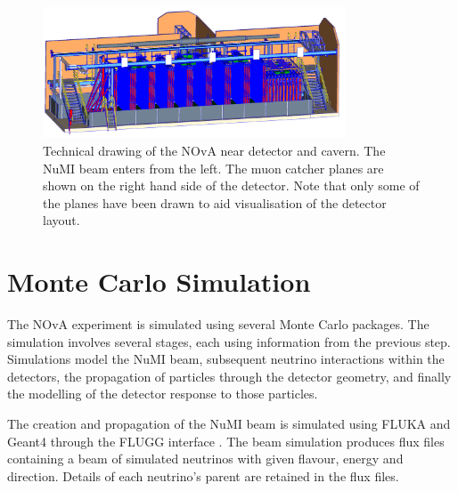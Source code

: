 \begin{figure}
  \centering
  \includegraphics[width=0.8\textwidth]{../../img/baird/det/ND_01.png}
  \caption{Technical drawing of the NOvA near detector and 
    cavern. The NuMI beam enters from the left. The muon
    catcher planes are shown on the right hand side of the
    detector. Note that only some of the planes have been drawn to
    aid visualisation of the detector layout.} 
  \label{fig:neardet}
\end{figure}



\section{Monte Carlo Simulation}

The NOvA experiment is simulated using several Monte Carlo packages.
The simulation involves several stages, each using information
from the previous step. Simulations model the
NuMI beam, subsequent neutrino interactions within the detectors,
the propagation of particles through the detector geometry, and
finally the modelling of the detector response to those particles.

The creation and propagation of the NuMI beam is simulated using FLUKA
and Geant4 through the FLUGG interface \cite{FLUKA, ferrari2005fluka,
  agostinelli2003geant4}. The beam simulation produces flux files
containing a beam of simulated neutrinos with given flavour, energy
and direction. Details of each neutrino's parent are retained in the
flux files.

